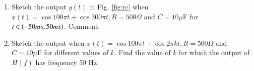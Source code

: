 \documentclass[journal,12pt,twocolumn]{IEEEtran}
\begin{document}
\begin{enumerate}[1.]
\item Sketch the output $y(t)$ in Fig. \ref{fig:rc} when $x(t) = \cos 100\pi t + 
\cos 300 \pi t, R = 500 \Omega$ and $C = 10 
\mu$F for $t \in \left(-50 ms, 50 ms\right)$. Comment.
\item Sketch the output when $x(t) = \cos 100\pi t + \cos 2 \pi k t, R = 500 \Omega$ and $C = 10 
\mu$F for different values of $k$.  Find the value of $k$ for which the output of  
$H(f)$ has frequency 50 Hz.
\end{enumerate}

%
\end{document}
